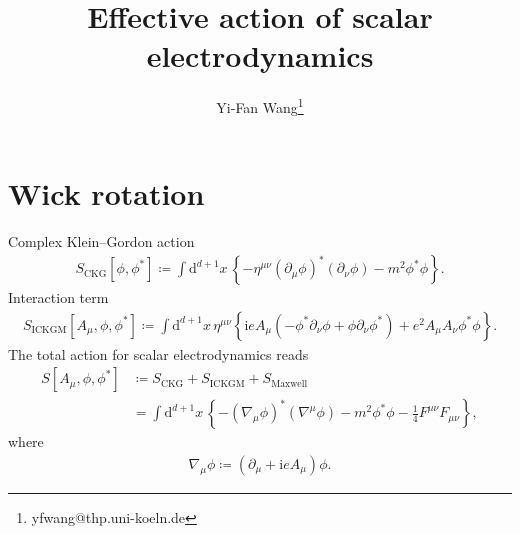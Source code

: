 \documentclass[12pt]{article}
\newcommand\mi{\mathrm{i}} %
\newcommand\dif{\mathrm{d}}
\newcommand{\rbr}[1]{{\left(#1\right)}}
\newcommand{\cbr}[1]{{\left\{#1\right\}}}
\newcommand{\sfun}[2]{{#1}\mathopen{}\left[#2\right]\mathclose{}}
\begin{document}
\title{Effective action of scalar electrodynamics} 


\date{}


\author[3]{Yi-Fan Wang\thanks{yfwang@thp.uni-koeln.de}}





\maketitle

%


\section{Wick rotation}


Complex Klein--Gordon action
\begin{align}
\sfun{S_\text{CKG}}{\phi,\phi^*}\coloneqq\int\dif^{d+1}x\,\cbr{-\eta^{\mu\nu}
\rbr{\partial_\mu\phi}^* \rbr{\partial_\nu\phi} - m^2\phi^*\phi}.
\end{align}
Interaction term
\begin{align}
\sfun{S_\text{ICKGM}}{A_\mu,\phi,\phi^*} \coloneqq \int\dif^{d+1}x\,
\eta^{\mu\nu}{}
\cbr{\mi e A_\mu \rbr{-\phi^*\partial_\nu\phi+\phi\partial_\nu\phi^*}
+e^2 A_\mu A_\nu \phi^* \phi}.
\end{align}
The total action for scalar electrodynamics reads
\begin{align}
\sfun{S}{A_\mu, \phi, \phi^*} &\coloneqq 
S_\text{CKG} + S_\text{ICKGM} + S_\text{Maxwell} \nonumber \\
&= \int\dif^{d+1}x\,\cbr{-\rbr{\nabla_{\!\mu} \phi}^* \rbr{\nabla^\mu\phi} - 
m^2\phi^*\phi -\frac{1}{4}F^{\mu\nu}F_{\mu\nu}},
\end{align}
where
\begin{align}
\nabla_\mu\phi \coloneqq \rbr{\partial_\mu+\mi e A_\mu}\phi.
\end{align}
\end{document}

